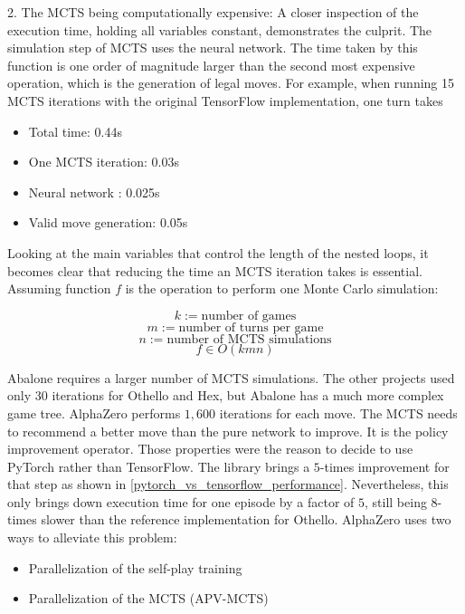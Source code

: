 2. The MCTS being computationally expensive: A closer inspection of the execution time, holding all variables constant, demonstrates the culprit. The simulation step of MCTS uses the neural network. The time taken by this function is one order of magnitude larger than the second most expensive operation, which is the generation of legal moves. For example, when running 15 MCTS iterations with the original TensorFlow implementation, one turn takes

\begin{itemize}
    \item Total time: 0.44s
    \item One MCTS iteration: 0.03s
    \item Neural network : 0.025s
    \item Valid move generation: 0.05s
\end{itemize}

Looking at the main variables that control the length of the nested loops, it becomes clear that reducing the time an MCTS iteration takes is essential. Assuming function $f$ is the operation to perform one Monte Carlo simulation:

$$
    k := \text{number of games}
$$
$$
    m := \text{number of turns per game}
$$
$$
    n := \text{number of MCTS simulations}
$$
$$
    f \in O(kmn)
$$

Abalone requires a larger number of MCTS simulations. The other projects \cite{bruasdal_deep_2020,thakoor_learning_nodate} used only 30 iterations for Othello and Hex, but Abalone has a much more complex game tree. AlphaZero performs $1,600$ iterations \cite[p. 11]{silver_mastering_2017} for each move. The MCTS needs to recommend a better move than the pure network to improve. It is the policy improvement operator. Those properties were the reason to decide to use PyTorch rather than TensorFlow. The library brings a $5$-times improvement for that step as shown in \ref{pytorch_vs_tensorflow_performance}. Nevertheless, this only brings down execution time for one episode by a factor of $5$, still being $8$-times slower than the reference implementation for Othello. AlphaZero uses two ways to alleviate this problem:

\begin{itemize}
    \item Parallelization of the self-play training
    \item Parallelization of the MCTS (APV-MCTS)
\end{itemize}

